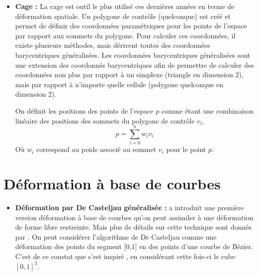 \begin{itemize}
\item{\textbf{Cage :}} La cage est outil le plus utilisé ces dernières
  années en terme de déformation spatiale. Un polygone de contrôle
  (quelconque) est créé et permet de définir des coordonnées
  paramétriques pour les points de l'espace par rapport aux sommets du
  polygone. Pour calculer ces coordonnées, il existe plusieurs
  méthodes, mais dérivent toutes des coordonnées barycentriques
  généralisées. Les coordonnées barycentriques généralisées sont une
  extension des coordonnés barycentriques afin de permettre de
  calculer des coordonnées non plus par rapport à un simplexe
  (triangle en dimension 2), mais par rapport à n'importe quelle
  cellule (polygone quelconque en dimension 2).

  On définit les positions des points de l'espace $p$ comme étant une
  combinaison linéaire des positions des sommets du polygone de
  contrôle $v_i$.
  \begin{equation}
    p = \sum_{i=0}^n w_iv_i
  \end{equation}
  Où $w_i$ correspond au poids associé au sommet $v_i$ pour le point
  $p$.
\end{itemize}

\section{Déformation à base de courbes}
\begin{itemize}
\item{\textbf{Déformation par De Casteljau généralisée :}} \cite{CR94}
  a introduit une première version déformation à base de courbes qu'on
  peut assimiler à une déformation de forme libre restreinte. Mais
  plus de détails sur cette technique sont donnés par \cite{BE01}.  On
  peut considérer l'algorithme de De Casteljau comme une déformation
  des points du segment [0,1] en des points d'une courbe de
  Bézier. C'est de ce constat que s'est inspiré \cite{CR94}, en
  considérant cette fois-ci le cube $[0,1]^3$.
\end{itemize}

